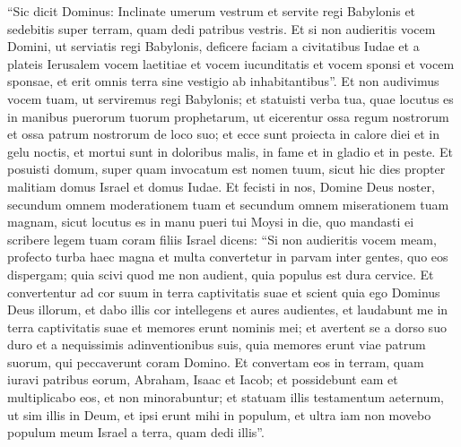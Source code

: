 \begin{biblechapter}
\begin{biblechapter}
\verse “Sic dicit Dominus: Inclinate umerum vestrum et servite regi Babylonis et sedebitis super terram, quam dedi patribus vestris. 
\verse Et si non audieritis vocem Domini, ut serviatis regi Babylonis, deficere faciam a civitatibus Iudae et a plateis Ierusalem 
\verse vocem laetitiae et vocem iucunditatis et vocem sponsi et vocem sponsae, et erit omnis terra sine vestigio ab inhabitantibus”. 
\verse Et non audivimus vocem tuam, ut serviremus regi Babylonis; et statuisti verba tua, quae locutus es in manibus puerorum tuorum prophetarum, ut eicerentur ossa regum nostrorum et ossa patrum nostrorum de loco suo; 
\verse et ecce sunt proiecta in calore diei et in gelu noctis, et mortui sunt in doloribus malis, in fame et in gladio et in peste. 
 \verse Et posuisti domum, super quam invocatum est nomen tuum, sicut hic dies propter malitiam domus Israel et domus Iudae. 
\verse Et fecisti in nos, Domine Deus noster, secundum omnem moderationem tuam et secundum omnem miserationem tuam magnam, 
\verse sicut locutus es in manu pueri tui Moysi in die, quo mandasti ei scribere legem tuam coram filiis Israel 
\verse dicens: “Si non audieritis vocem meam, profecto turba haec magna et multa convertetur in parvam inter gentes, quo eos dispergam; 
\verse quia scivi quod me non audient, quia populus est dura cervice. Et convertentur ad cor suum in terra captivitatis suae 
 \verse et scient quia ego Dominus Deus illorum, et dabo illis cor intellegens et aures audientes, 
\verse et laudabunt me in terra captivitatis suae et memores erunt nominis mei; 
\verse et avertent se a dorso suo duro et a nequissimis adinventionibus suis, quia memores erunt viae patrum suorum, qui peccaverunt coram Domino. 
\verse Et convertam eos in terram, quam iuravi patribus eorum, Abraham, Isaac et Iacob; et possidebunt eam et multiplicabo eos, et non minorabuntur; 
\verse et statuam illis testamentum aeternum, ut sim illis in Deum, et ipsi erunt mihi in populum, et ultra iam non movebo populum meum Israel a terra, quam dedi illis”.
 

\end{biblechapter}
\end{biblechapter}
